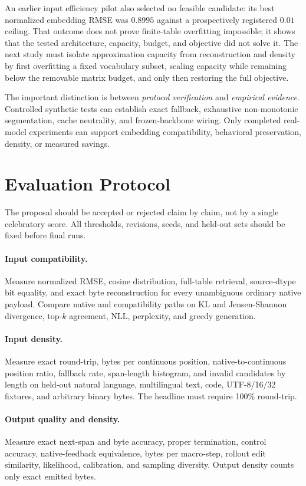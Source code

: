 \documentclass[10pt,twocolumn]{article}
\begin{document}
An earlier input efficiency pilot also selected no feasible candidate: its best normalized
embedding RMSE was $0.8995$ against a prospectively registered $0.01$ ceiling. That outcome does
not prove finite-table overfitting impossible; it shows that the tested architecture, capacity,
budget, and objective did not solve it. The next study must isolate approximation capacity from
reconstruction and density by first overfitting a fixed vocabulary subset, scaling capacity while
remaining below the removable matrix budget, and only then restoring the full objective.

The important distinction is between \emph{protocol verification} and \emph{empirical evidence}.
Controlled synthetic tests can establish exact fallback, exhaustive non-monotonic segmentation,
cache neutrality, and frozen-backbone wiring. Only completed real-model experiments can support
embedding compatibility, behavioral preservation, density, or measured savings.

\section{Evaluation Protocol}

The proposal should be accepted or rejected claim by claim, not by a single celebratory score.
All thresholds, revisions, seeds, and held-out sets should be fixed before final runs.

\paragraph{Input compatibility.}
Measure normalized RMSE, cosine distribution, full-table retrieval, source-dtype bit equality, and
exact byte reconstruction for every unambiguous ordinary native payload. Compare native and
compatibility paths on KL and Jensen-Shannon divergence, top-$k$ agreement, NLL, perplexity, and
greedy generation.

\paragraph{Input density.}
Measure exact round-trip, bytes per continuous position, native-to-continuous position ratio,
fallback rate, span-length histogram, and invalid candidates by length on held-out natural
language, multilingual text, code, UTF-8/16/32 fixtures, and arbitrary binary bytes. The headline
must require 100\% round-trip.

\paragraph{Output quality and density.}
Measure exact next-span and byte accuracy, proper termination, control accuracy, native-feedback
equivalence, bytes per macro-step, rollout edit similarity, likelihood, calibration, and sampling
diversity. Output density counts only exact emitted bytes.
\end{document}
